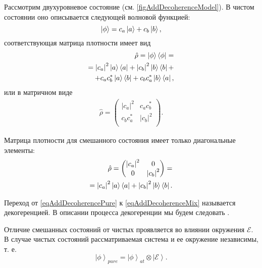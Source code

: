 Рассмотрим двухуровневое состояние
(см. \autoref{figAddDecoherenceModel}). В чистом состоянии оно
описывается 
следующей волновой функцией:
\begin{equation}
\left|\phi\right> = c_a \ket{a } + c_b \ket{b},
\nonumber
\end{equation}
соответствующая матрица плотности имеет вид
\begin{eqnarray}
\hat{\rho} = \left|\phi\right>\left<\phi\right| =
\nonumber \\
= 
\left|c_a\right|^2 \ket{a}\bra{a} + 
\left|c_b\right|^2 \ket{b}\bra{b} +
\nonumber \\
+
c_a c_b^{\ast}\ket{a}\bra{b} +
c_b c_a^{\ast}\ket{b}\bra{a},
\label{eqAddDecoherencePure}
\end{eqnarray}
или в матричном виде
\begin{eqnarray}
\hat{\rho} = 
\begin{pmatrix}
\left|c_a\right|^2 & c_a c_b^{\ast} \\
c_b c_a^{\ast} & \left|c_b\right|^2 \\
\end{pmatrix}.
\nonumber
\end{eqnarray}

Матрица плотности 
для смешанного состояния имеет только диагональные
элементы:
\begin{eqnarray}
\hat{\rho} = 
\begin{pmatrix}
\left|c_a\right|^2 & 0 \\
0 & \left|c_b\right|^2 \\
\end{pmatrix} = 
\nonumber \\
=
\left|c_a\right|^2 \ket{a}\bra{a} + 
\left|c_b\right|^2 \ket{b}\bra{b}.
\label{eqAddDecoherenceMix}
\end{eqnarray}



Переход от \eqref{eqAddDecoherencePure} к \eqref{eqAddDecoherenceMix}
называется декогеренцией. В описании процесса декогеренции мы будем следовать
 \cite{bMensky2001}. 

Отличие смешанных состояний от чистых проявляется во влиянии окружения
$\mathcal{E}$. В случае чистых состояний рассматриваемая система и ее
окружение независимы, т. е.
\begin{equation}
\left|\phi\right>_{pure} = \left|\phi\right>_{at} \otimes
\left|\mathcal{E}\right>.
\label{eqAddDecoherencePhiPure}
\end{equation}

